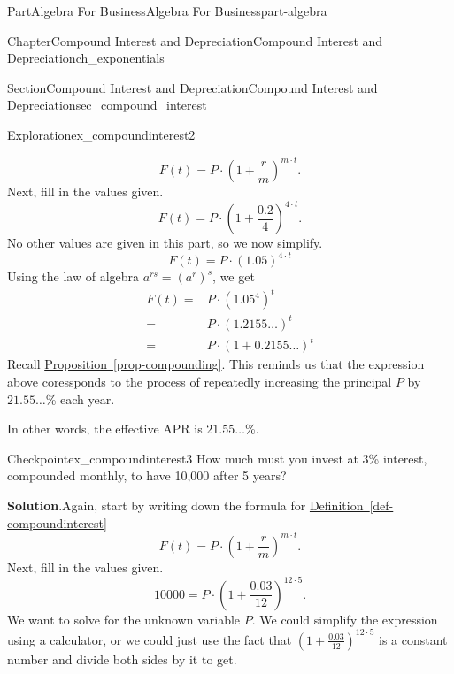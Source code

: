 \documentclass{tufte-book}
\newcommand{\blocktitlefont}{\relax}
\newcommand{\xreffont}{\relax}
\numberwithin{equation}{chapter}
\newcommand{\amp}{&}
\begin{document}
\begin{partptx}{Part}{Algebra For Business}{}{Algebra For Business}{}{}{part-algebra}
\begin{chapterptx}{Chapter}{Compound Interest and Depreciation}{}{Compound Interest and Depreciation}{}{}{ch_exponentials}
\begin{sectionptx}{Section}{Compound Interest and Depreciation}{}{Compound Interest and Depreciation}{}{}{sec_compound_interest}
\begin{exploration}{Exploration}{}{ex_compoundinterest2}
\begin{enumerate}[font=\bfseries,label=(\alph*),ref=\alph*]
\begin{equation*}
F(t) = P \cdot \left(1 + \frac{r}{m}\right)^{m\cdot t}\text{.}
\end{equation*}
Next, fill in the values given.%
\begin{equation*}
F(t) = P \cdot \left(1 + \frac{0.2}{4}\right)^{4\cdot t}\text{.}
\end{equation*}
No other values are given in this part, so we now simplify.%
\begin{equation*}
F(t) = P \cdot \left(1.05\right)^{4\cdot t}
\end{equation*}
Using the law of algebra \(a^{rs} = (a^r)^s\), we get%
\begin{align*}
F(t) = \amp P \cdot \left(1.05^4\right)^{t}\\
= \amp P \cdot \left(1.2155\dots \right)^{t} \\
= \amp P \cdot \left(1 + 0.2155\dots \right)^{t} 
\end{align*}
Recall \hyperref[prop-compounding]{Proposition~{\xreffont\ref{prop-compounding}}}.  This reminds us that the expression above coressponds to the process of repeatedly increasing the principal \(P\) by \(21.55\dots\)\% each year.%
\par
In other words, the effective APR is \(21.55\dots\)\%.%
\end{enumerate}%
\end{exploration}%
\begin{inlineexercise}{Checkpoint}{}{ex_compoundinterest3}%
How much must you invest at 3\% interest, compounded monthly, to have 10,000 after 5 years?%
\par\smallskip%
\noindent\textbf{\blocktitlefont Solution}.\hypertarget{ex_compoundinterest3-2}{}\quad{}Again, start by writing down the formula for  \hyperref[def-compoundinterest]{Definition~{\xreffont\ref{def-compoundinterest}}}%
\begin{equation*}
F(t) = P \cdot \left(1 + \frac{r}{m}\right)^{m\cdot t}\text{.}
\end{equation*}
Next, fill in the values given.%
\begin{equation*}
10000 = P \cdot \left(1 + \frac{0.03}{12}\right)^{12\cdot 5}\text{.}
\end{equation*}
We want to solve for the unknown variable \(P\).  We could simplify the expression using a calculator, or we could just use the fact that \(\left(1 + \frac{0.03}{12}\right)^{12\cdot 5}\) is a constant number and divide both sides by it to get.%
\begin{equation*}

\end{equation*}
\end{inlineexercise}
\end{sectionptx}
\end{chapterptx}
\end{partptx}
\end{document}
